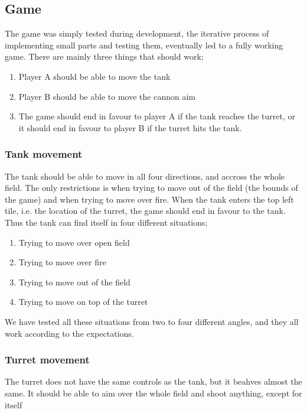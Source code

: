 \subsection{Game}
The game was simply tested during development, the iterative process of implementing
small parts and testing them, eventually led to a fully working game. There are 
mainly three things that should work;
\begin{enumerate}
  \item Player A should be able to move the tank
  \item Player B should be able to move the cannon aim
  \item The game should end in favour to player A if the tank reaches the turret, or it
  	should end in favour to player B if the turret hits the tank.
\end{enumerate}

\subsubsection{Tank movement}
The tank should be able to move in all four directions, and accross the whole field. The only 
restrictions is when trying to move out of the field (the bounds of the game) and when
trying to move over fire. When the tank enters the top left tile, i.e. the location of the 
turret, the game should end in favour to the tank. Thus the tank can find itself in four
different situations;
\begin{enumerate}
  \item Trying to move over open field
  \item Trying to move over fire
  \item Trying to move out of the field
  \item Trying to move on top of the turret
\end{enumerate}
We have tested all these situations from two to four different angles, and they all
work according to the expectations.

\subsubsection{Turret movement}
The turret does not have the same controls as the tank, but it beahves almost the same. 
It should be able to aim over the whole field and shoot anything, except for itself 
